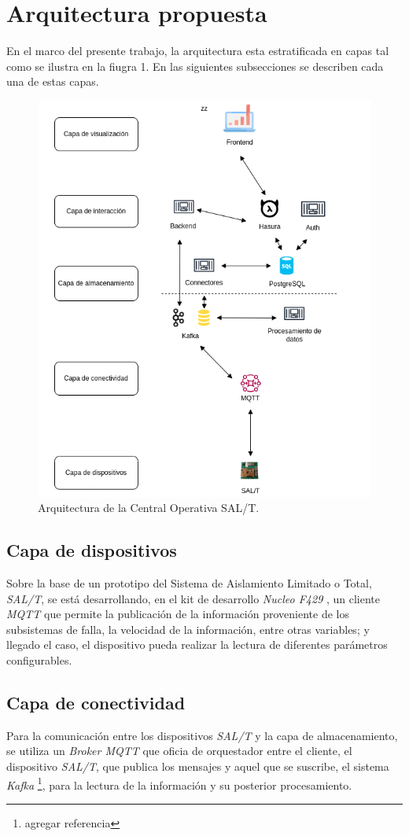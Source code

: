 \documentclass[a4paper]{IEEEtran}
\begin{document}
\section{Arquitectura propuesta}

En el marco del presente trabajo, la arquitectura esta estratificada en capas
tal como se ilustra en la fiugra 1. En las siguientes subsecciones se describen cada una de estas capas.

\begin{figure}[ht]
\centering 
\includegraphics[width=.5\textwidth]{diagram.png}
\caption{Arquitectura de la Central Operativa SAL/T.}
\label{fig:diagBloques}
\end{figure}


\subsection{Capa de dispositivos}

Sobre la base de un prototipo del Sistema de Aislamiento Limitado o Total, \textit{SAL/T}, se está desarrollando, en el kit de desarrollo \textit{Nucleo F429} \cite{b5}, un cliente \textit{MQTT} \cite{b6} que permite la publicación de la información proveniente de los subsistemas de falla, la velocidad de la información, entre otras variables; y llegado el caso, el dispositivo pueda realizar la lectura de diferentes parámetros configurables.

\subsection{Capa de conectividad}

Para la comunicación entre los dispositivos \textit{SAL/T} y la capa de almacenamiento, se utiliza un \textit{Broker MQTT} que oficia de orquestador entre el cliente, el dispositivo \textit{SAL/T}, que publica los mensajes y aquel que se suscribe, el sistema \textit{Kafka} \cite{b7} \footnote{agregar referencia}, para la lectura de la información y su posterior procesamiento. 
\end{document}

